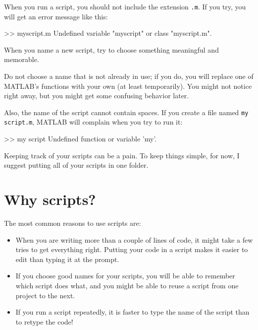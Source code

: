 \documentclass[
]{book}
\numberwithin{Answer}{chapter}
\numberwithin{Exercise}{chapter}
\begin{document}
When you run a script, you should not include the extension {\tt .m}.  If you try, you will get an error message like this:

\begin{code}
>> myscript.m
Undefined variable "myscript" or class "myscript.m".
\end{code}

When you name a new script, try to choose something meaningful and memorable. 

Do not choose a name that is not already in use; if you do, you will replace one of MATLAB's functions with your own (at least temporarily).
You might not notice right away, but you might get some confusing behavior later.


Also, the name of the script cannot contain spaces.  If you create
a file named {\tt my script.m}, MATLAB will complain when you try
to run it:

\begin{code}
>> my script
Undefined function or variable 'my'.
\end{code}

Keeping track of your scripts can be a pain.  To keep things simple,
for now, I suggest putting all of your scripts in one folder.


\section{Why scripts?}

The most common reasons to use scripts are:


\begin{itemize}

\item When you are writing more than a couple of lines of code, it
might take a few tries to get everything right.  Putting your code
in a script makes it easier to edit than typing it at the prompt.

\item If you choose good names for your scripts, you will be able
to remember which script does what, and you might be able to reuse
a script from one project to the next.

\item If you run a script repeatedly, it is faster to type the
name of the script than to retype the code!

\end{itemize}
\end{document}
